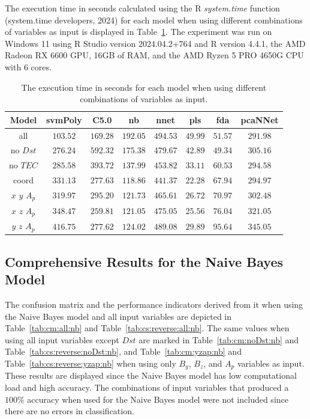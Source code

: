 \documentclass[sn-mathphys-num]{sn-jnl}%
\begin{document}
The execution time in seconds calculated using the R \textit{system.time} function (system.time developers, 2024) for each model when using different combinations of variables as input is displayed in Table~\ref{tab:time:total}. The experiment was run on Windows 11 using R Studio version 2024.04.2+764 and R version 4.4.1, the AMD Radeon RX 6600 GPU, 16GB of RAM, and the AMD Ryzen 5 PRO 4650G CPU with 6 cores.

\begin{table}[!ht]
    \centering
    \caption{The execution time in seconds for each model when using different combinations of variables as input.}
	\label{tab:time:total}
	\begin{tabular}{|c|c|c|c|c|c|c|c|}
		\hline
		Model & svmPoly & C5.0 & nb & nnet & pls & fda & pcaNNet \\ \hline
		all & $103.52$ & $169.28$ & $192.05$ & $494.53$ & $49.99$ & $51.57$ & $291.98$ \\ \hline
		no $Dst$ & $276.24$ & $592.32$ & $175.38$ & $479.67$ & $42.89$ & $49.34$ & $305.16$ \\ \hline
		no $TEC$ & $285.58$ & $393.72$ & $137.99$ & $453.82$ & $33.11$ & $60.53$ & $294.58$ \\ \hline
		coord & $331.13$ & $277.63$ & $118.86$ & $441.37$ & $22.28$ & $67.94$ & $294.97$ \\ \hline
		$x$ $y$ $A_{p}$ & $319.97$ & $295.20$ & $121.73$ & $465.61$ & $26.72$ & $70.97$ & $302.48$ \\ \hline
		$x$ $z$ $A_{p}$ & $348.47$ & $259.81$ & $121.05$ & $475.05$ & $25.56$ & $76.04$ & $321.05$ \\ \hline
		$y$ $z$ $A_{p}$ & $416.75$ & $277.62$ & $124.02$ & $489.08$ & $29.89$ & $95.64$ & $345.05$ \\ \hline
	\end{tabular}
\end{table}

\subsection{Comprehensive Results for the Naive Bayes Model}

The confusion matrix and the performance indicators derived from it when using the Naive Bayes model and all input variables are depicted in Table~\ref{tab:cm:all:nb} and Table~\ref{tab:cs:reverse:all:nb}. The same values when using all input variables except $Dst$ are marked in Table~\ref{tab:cm:noDst:nb} and Table~\ref{tab:cs:reverse:noDst:nb}, and Table~\ref{tab:cm:yzap:nb} and Table~\ref{tab:cs:reverse:yzap:nb} when using only $B_{y}$, $B_{z}$, and $A_{p}$ variables as input. These results are displayed since the Naive Bayes model has low computational load and high accuracy. The combinations of input variables that produced a $100\%$ accuracy when used for the Naive Bayes model were not included since there are no errors in classification.
\end{document}

